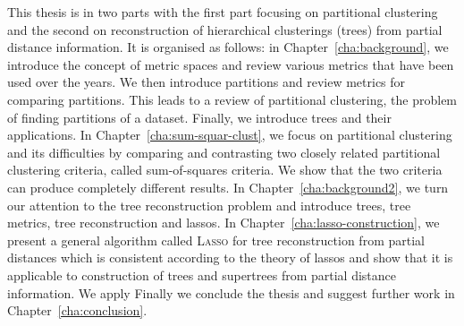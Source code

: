 This thesis is in two parts with the first part focusing on partitional
clustering and the second on reconstruction of hierarchical clusterings
(trees) from partial distance information.  It is organised as follows: in
Chapter~\ref{cha:background}, we introduce the concept of metric spaces and
review various metrics that have been used over the years.  We then introduce
partitions and review metrics for comparing partitions.  This leads to a
review of partitional clustering, the problem of finding partitions of a
dataset.  Finally, we introduce trees and their applications.  In
Chapter~\ref{cha:sum-squar-clust}, we focus on partitional clustering and its
difficulties by comparing and contrasting two closely related partitional
clustering criteria, called sum-of-squares criteria.  We show that the two
criteria can produce completely different results.  In
Chapter~\ref{cha:background2}, we turn our attention to the tree
reconstruction problem and introduce trees, tree metrics, tree reconstruction
and lassos.
In Chapter~\ref{cha:lasso-construction}, we present a general algorithm called
\textsc{Lasso} for tree reconstruction from partial distances which is
consistent according to the theory of lassos and show that it is applicable to
construction of trees and supertrees from partial distance information.  We
apply Finally we conclude the thesis and suggest further work in
Chapter~\ref{cha:conclusion}.

